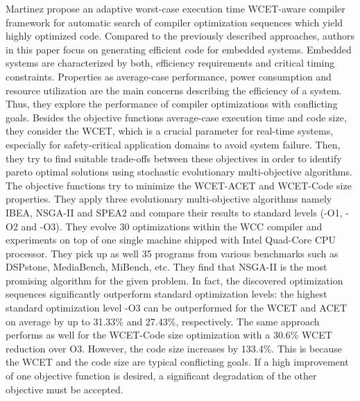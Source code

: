 Martinez \etal\cite{martinez2014multi} propose an adaptive worst-case execution time WCET-aware compiler framework for automatic search of compiler optimization sequences which yield highly optimized code. 
Compared to the previously described approaches, authors in this paper focus on generating efficient code for embedded systems. Embedded systems are characterized by both, efficiency requirements and critical timing constraints. Properties as average-case performance, power consumption and resource utilization are the main concerns describing the efficiency of a system. 
Thus, they explore the performance of compiler optimizations with conflicting goals. 
Besides the objective functions average-case execution time and code size, they consider the WCET, which is a crucial parameter for real-time systems, especially for safety-critical application domains to avoid system failure.
Then, they try to find suitable trade-offs between these objectives in order to identify pareto optimal solutions using stochastic evolutionary multi-objective algorithms. The objective functions try to minimize the WCET-ACET and WCET-Code size properties. They apply three evolutionary multi-objective algorithms namely IBEA, NSGA-II and SPEA2 and compare their results to standard levels (-O1, -O2 and -O3). 
They evolve 30 optimizations within the WCC compiler and  experiments on top of one single machine shipped with Intel Quad-Core CPU processor. They pick up as well 35  programs from various benchmarks such as DSPstone, MediaBench, MiBench, etc.
They find that NSGA-II is the most promising algorithm for the given problem. In fact, the discovered optimization sequences significantly outperform standard optimization levels:
the highest standard optimization level -O3 can be outperformed for the WCET and ACET on average by up to 31.33\% and 27.43\%, respectively. The same approach performs as well for the WCET-Code size optimization with a 30.6\% WCET reduction over O3. However, the code size increases by 133.4\%. This is because the WCET and the code size are typical conflicting goals. If a high improvement of one objective function is desired, a significant degradation of the other objective must be accepted.

